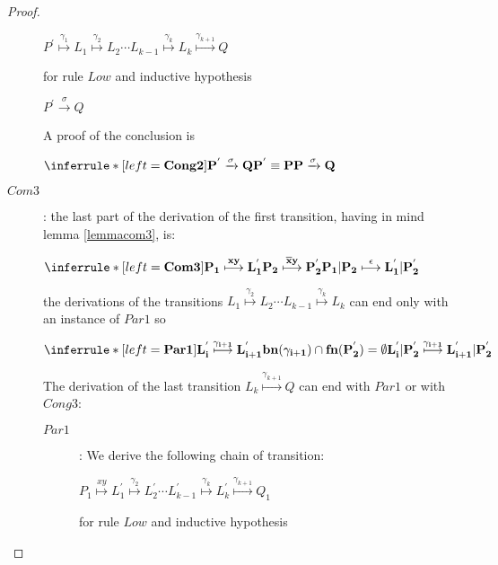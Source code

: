 \begin{proposition}
\begin{proof}
\begin{description}
\begin{center}
		  $P^{'} \stackrel{\gamma_{1}}{\longmapsto} L_{1} \stackrel{\gamma_{2}}{\longmapsto} L_{2} \cdots L_{k-1} \stackrel{\gamma_{k}}{\longmapsto} L_{k}\stackrel{\gamma_{k+1}}{\longmapsto} Q$
		\end{center}
		for rule $Low$ and inductive hypothesis
		\begin{center}
		  $P^{'} \xrightarrow{\sigma} Q$ 
		\end{center}
		A proof of the conclusion is
		\begin{center}
		  $\inferrule* [left=\bf{Cong2}]{
			P^{'} \xrightarrow{\sigma} Q
		    \\
		      P^{'} \equiv P
		  }{
		    P \xrightarrow{\sigma} Q
		  }$ 
		\end{center}
	      \item[$Com3$]: 
		the last part of the derivation of the first transition, having in mind lemma \ref{lemmacom3}, is:
		\begin{center}
		  $\inferrule* [left=\bf{Com3}]{
		      P_{1} \stackrel{xy}{\longmapsto} L_{1}^{'}
		    \\
		      P_{2} \stackrel{\overline{x}y}{\longmapsto} P_{2}^{'}
		  }{
		    P_{1}|P_{2} \stackrel{\epsilon}{\longmapsto} L_{1}^{'}|P_{2}^{'}
		  }$ 		      
		\end{center}
		the derivations of the transitions $L_{1} \stackrel{\gamma_{2}}{\longmapsto} L_{2} \cdots L_{k-1} \stackrel{\gamma_{k}}{\longmapsto} L_{k}$ can end only with an instance of $Par1$ so 
		\begin{center}
		  $\inferrule* [left=\bf{Par1}]{
		      L_{i}^{'} \stackrel{\gamma_{i+1}}{\longmapsto} L_{i+1}^{'}
		    \\
		      bn(\gamma_{i+1})\cap fn(P_{2}^{'})=\emptyset
		  }{
		    L_{i}^{'}|P_{2}^{'} \stackrel{\gamma_{i+1}}{\longmapsto} L_{i+1}^{'}|P_{2}^{'}
		  }$ 		      		  
		\end{center}
		The derivation of the last transition $L_{k}\stackrel{\gamma_{k+1}}{\longmapsto} Q$ can end with $Par1$ or with $Cong3$:
		\begin{description}
		  \item[$Par1$]:
		    We derive the following chain of transition:
		    \begin{center}
		      $P_{1} \stackrel{xy}{\longmapsto} L_{1}^{'} \stackrel{\gamma_{2}}{\longmapsto} L_{2}^{'} \cdots L_{k-1}^{'} \stackrel{\gamma_{k}}{\longmapsto} L_{k}^{'}\stackrel{\gamma_{k+1}}{\longmapsto} Q_{1}$
		    \end{center}
		    for rule $Low$ and inductive hypothesis

\end{description}
\end{description}
\end{proof}
\end{proposition}
